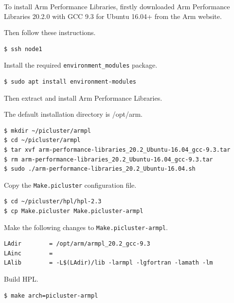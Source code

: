 \documentclass{report}
\begin{document}
To install Arm Performance Libraries, firstly downloaded Arm Performance Libraries 20.2.0 with GCC 9.3 for Ubuntu 16.04+ from the Arm website.

Then follow these instructions.

\lstset{style=type}
\begin{lstlisting}
$ ssh node1
\end{lstlisting}

Install the required \verb|environment_modules| package.

\lstset{style=type}
\begin{lstlisting}
$ sudo apt install environment-modules
\end{lstlisting}

Then extract and install Arm Performance Libraries.

The default installation directory is /opt/arm.

\lstset{style=type}
\begin{lstlisting}
$ mkdir ~/picluster/armpl
$ cd ~/picluster/armpl
$ tar xvf arm-performance-libraries_20.2_Ubuntu-16.04_gcc-9.3.tar
$ rm arm-performance-libraries_20.2_Ubuntu-16.04_gcc-9.3.tar
$ sudo ./arm-performance-libraries_20.2_Ubuntu-16.04.sh
\end{lstlisting}

Copy the \verb|Make.picluster| configuration file.

\lstset{style=type}
\begin{lstlisting}
$ cd ~/picluster/hpl/hpl-2.3
$ cp Make.picluster Make.picluster-armpl
\end{lstlisting}

Make the following changes to \verb|Make.picluster-armpl|.

\lstset{style=listing}
\begin{lstlisting}[caption=Make.picluster-armpl, numbers=none]
LAdir        = /opt/arm/armpl_20.2_gcc-9.3
LAinc        =
LAlib        = -L$(LAdir)/lib -larmpl -lgfortran -lamath -lm
\end{lstlisting}

Build HPL.

\lstset{style=type}
\begin{lstlisting}
$ make arch=picluster-armpl
\end{lstlisting}


%
%
\end{document}
